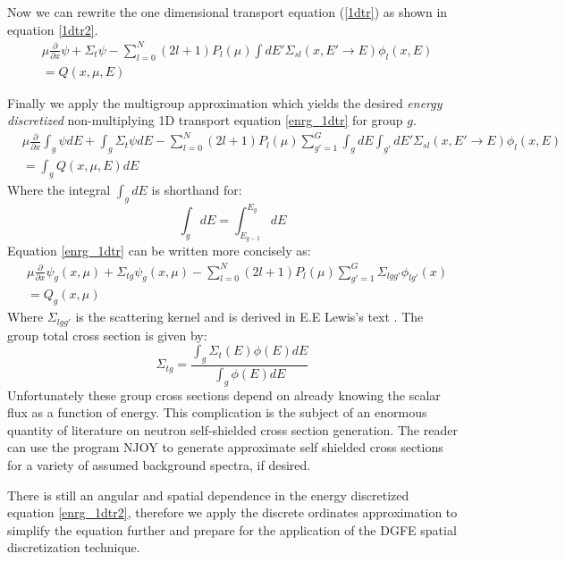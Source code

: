 Now we can rewrite the one dimensional transport equation (\ref{1dtr}) as shown in equation \ref{1dtr2}.
\begin{eqnarray}
& \mu \frac{\partial}{\partial x} \psi + \Sigma_t \psi -
\sum_{l=0}^N (2l+1) P_l(\mu) \int dE' \Sigma_{sl}(x, E'\rightarrow E) \phi_l(x, E)  
 \nonumber \\
& =
Q(x, \mu, E)
\label{1dtr2}
\end{eqnarray}

Finally we apply the multigroup approximation which yields the desired \emph{energy discretized} non-multiplying 1D transport equation \ref{enrg_1dtr} for group $g$.
\begin{eqnarray}
& \mu \frac{\partial}{\partial x} \int_g \psi dE + \int_g \Sigma_t \psi dE -
\sum_{l=0}^N (2l+1) P_l(\mu) 
\sum_{g'=1}^G \int_g dE \int_{g'} dE' \Sigma_{sl}(x, E'\rightarrow E) \phi_l(x, E)  
 \nonumber \\
& =
\int_g Q(x, \mu, E) dE
\label{enrg_1dtr}
\end{eqnarray}
Where the integral $\int_g dE$ is shorthand for:
\begin{equation}
\int_g dE = \int_{E_{g-1}}^{E_g} dE
\end{equation}
Equation \ref{enrg_1dtr} can be written more concisely as:
\begin{eqnarray}
& \mu \frac{\partial}{\partial x} \psi_g(x,\mu) + \Sigma_{tg} \psi_g(x,\mu) -
\sum_{l=0}^N (2l+1) P_l(\mu) 
\sum_{g'=1}^G \Sigma_{lgg'} \phi_{lg'}(x)
 \nonumber \\
& =
Q_g(x, \mu)
\label{enrg_1dtr2}
\end{eqnarray}
Where $\Sigma_{lgg'}$ is the scattering kernel and is derived in E.E Lewis's text \cite{Lewis}.
The group total cross section is given by:
\begin{equation}
\Sigma_{tg} = \frac{\int_g \Sigma_t(E)\phi (E) dE} {\int_g \phi (E) dE}
\end{equation}
Unfortunately these group cross sections depend on already knowing the scalar flux as a function of energy.  This complication is the subject of an enormous quantity of literature on neutron self-shielded cross section generation.  The reader can use the program NJOY to generate approximate self shielded cross sections for a variety of assumed background spectra, if desired.

There is still an angular and spatial dependence in the energy discretized equation \ref{enrg_1dtr2}, therefore we apply the discrete ordinates approximation to simplify the equation further and prepare for the application of the DGFE spatial discretization technique.


